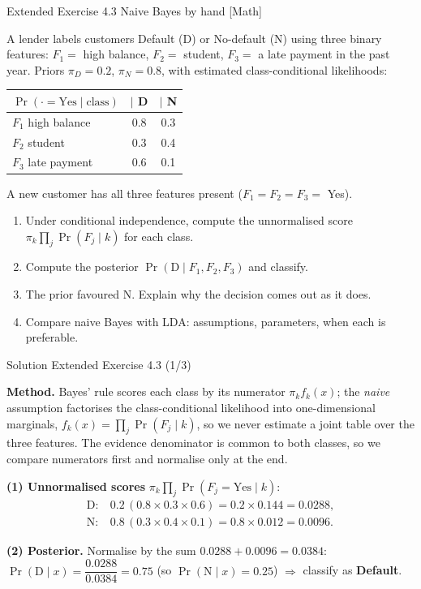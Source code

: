\documentclass[aspectratio=169,11pt]{beamer}
\begin{document}
\begin{frame}{Extended Exercise 4.3 \textemdash{} Naive Bayes by hand [Math]}
\begin{longexercise}
\scriptsize
A lender labels customers Default (D) or No-default (N) using three binary
features: $F_1=$ high balance, $F_2=$ student, $F_3=$ a late payment in
the past year. Priors $\pi_D=0.2$, $\pi_N=0.8$, with estimated
class-conditional likelihoods:
\begin{center}\small
\begin{tabular}{lcc}
\toprule
$\Pr(\cdot=\text{Yes}\mid\text{class})$ & $\mid$ D & $\mid$ N \\
\midrule
$F_1$ high balance  & 0.8 & 0.3 \\
$F_2$ student       & 0.3 & 0.4 \\
$F_3$ late payment  & 0.6 & 0.1 \\
\bottomrule
\end{tabular}
\end{center}
A new customer has all three features present ($F_1=F_2=F_3=$ Yes).
\begin{enumerate}
  \item Under conditional independence, compute the unnormalised score
        $\pi_k\prod_j\Pr(F_j\mid k)$ for each class.
  \item Compute the posterior $\Pr(\text{D}\mid F_1,F_2,F_3)$ and classify.
  \item The prior favoured N. Explain why the decision comes out as it
        does.
  \item Compare naive Bayes with LDA: assumptions, parameters, when each
        is preferable.
\end{enumerate}
\end{longexercise}
\end{frame}

\begin{frame}{Solution \textemdash{} Extended Exercise 4.3 (1/3)}
\begin{solutionbox}
\textbf{Method.} Bayes' rule scores each class by its numerator
$\pi_k f_k(x)$; the \emph{naive} assumption factorises the
class-conditional likelihood into one-dimensional marginals,
$f_k(x)=\prod_j\Pr(F_j\mid k)$, so we never estimate a joint table over
the three features. The evidence denominator is common to both classes,
so we compare numerators first and normalise only at the end.

\vspace{1mm}
\textbf{(1) Unnormalised scores} $\pi_k\prod_j\Pr(F_j=\text{Yes}\mid k)$:
\[
\begin{aligned}
  \text{D}:&\ 0.2\,(0.8\times 0.3\times 0.6)=0.2\times 0.144=0.0288,\\
  \text{N}:&\ 0.8\,(0.3\times 0.4\times 0.1)=0.8\times 0.012=0.0096.
\end{aligned}
\]

\textbf{(2) Posterior.} Normalise by the sum $0.0288+0.0096=0.0384$:
$\Pr(\text{D}\mid x)=\dfrac{0.0288}{0.0384}=0.75$
(so $\Pr(\text{N}\mid x)=0.25$) $\Rightarrow$ classify as \textbf{Default}.
\end{solutionbox}
\end{frame}
\end{document}
